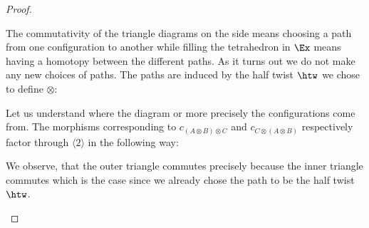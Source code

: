 \begin{proof}
\begin{center}
\begin{tikzpicture}
        \end{tikzpicture}
    \end{center}
    The commutativity of the triangle diagrams on the side means choosing a path from one configuration to 
    another while filling the tetrahedron in $\Ex$ means having a homotopy between the different paths. 
    As it turns out we do not make any new choices of paths. The paths are induced by the half twist $\htw$ 
    we chose to define $\otimes$:

    Let us understand where the diagram or more precisely the configurations come from.
    The morphisms corresponding to $c_{(A \otimes B) \otimes C}$ and $c_{C \otimes (A \otimes B)}$ 
    respectively factor through $\langle 2 \rangle$ in the following way:
    \begin{center}
    \end{center}
    We observe, that the outer triangle commutes precisely because the inner triangle
    commutes which is the case since we already chose the path to be the half twist $\htw$.
    \begin{center}
\end{center}
\end{proof}
